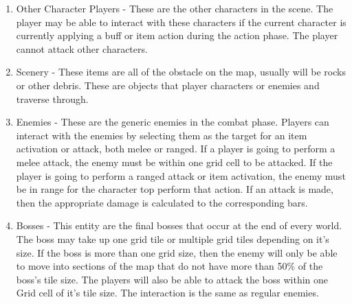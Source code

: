 \documentclass[12pt, titlepage]{article}
\begin{document}
\begin{enumerate}
	\begin{enumerate}
	\item Other Character Players - These are the other characters in the scene. The player may be able to interact with these characters if the current character is currently applying a buff or item action during the action phase. The player cannot attack other characters.
	\item Scenery - These items are all of the obstacle on the map, usually will be rocks or other debris. These are objects that player characters or enemies and traverse through. 
	\item Enemies - These are the generic enemies in the combat phase. Players can interact with the enemies by selecting them as the target for an item activation or attack, both melee or ranged. If a player is going to perform a melee attack, the enemy must be within one grid cell to be attacked. If the player is going to perform a ranged attack or item activation, the enemy must be in range for the character top perform that action. If an attack is made, then the appropriate damage is calculated to the corresponding bars.
	\item Bosses - This entity are the final bosses that occur at the end of every world. The boss may take up one grid tile or multiple grid tiles depending on it's size. If the boss is more than one grid size, then the enemy will only be able to move into sections of the map that do not have more than 50\% of the boss's tile size. The players will also be able to attack the boss within one Grid cell of it's tile size. The interaction is the same as regular enemies.
	\end{enumerate}
	

\end{enumerate}
\end{document}
